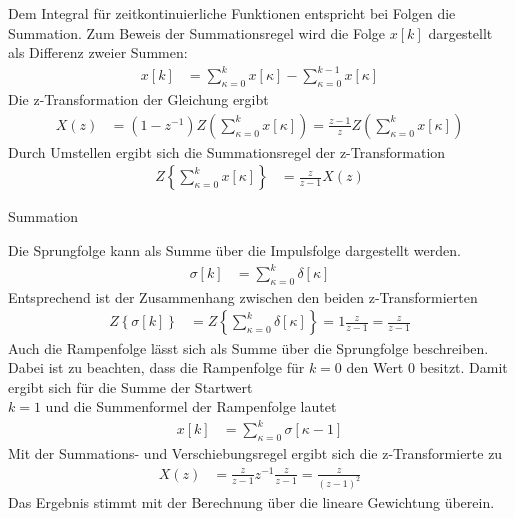 Dem Integral für zeitkontinuierliche Funktionen entspricht bei Folgen die Summation. Zum Beweis der Summationsregel wird die Folge \(x[k]\) dargestellt als Differenz zweier Summen:
\begin{align}
x[ k] &= \sum\limits_{\kappa = 0}^{k}{x[\kappa] -}\sum\limits_{\kappa = 0}^{k - 1}{x[\kappa]} \label{eq:5.61}
\end{align}
Die z-Transformation der Gleichung ergibt
\begin{align}
X(z) &= \left( 1 - z^{- 1} \right)  Z\left( \sum\limits_{\kappa = 0}^{k}{x[\kappa]} \right) = \frac{z - 1}{z}  Z\left( \sum\limits_{\kappa = 0}^{k}{x[\kappa]} \right) \label{eq:5.62}
\end{align}
Durch Umstellen ergibt sich die Summationsregel der z-Transformation
\begin{align}
Z\left\{ \sum\limits_{\kappa = 0}^{k}{x[\kappa]} \right\} &= \frac{z}{z - 1}  X(z) \label{eq:5.63}
\end{align}
\begin{example}{Summation}
\label{example:beispiel-summation}

Die Sprungfolge kann als Summe über die Impulsfolge dargestellt werden.
\begin{align*}
\sigma[ k] &= \sum\limits_{\kappa = 0}^{k}{\delta[\kappa]} 
\end{align*}
Entsprechend ist der Zusammenhang zwischen den beiden z-Transformierten
\begin{align*}
Z\left\{ \sigma[ k] \right\} &= Z\left\{ \sum\limits_{\kappa = 0}^{k}{\delta[\kappa]} \right\} = 1  \frac{z}{z - 1} = \frac{z}{z - 1} 
\end{align*}
Auch die Rampenfolge lässt sich als Summe über die Sprungfolge beschreiben. Dabei ist zu beachten, dass die Rampenfolge für \(k = 0\) den Wert 0 besitzt. Damit ergibt sich für die Summe der Startwert\\
\(k = 1\) und die Summenformel der Rampenfolge lautet
\begin{align*}
x[ k] &= \sum\limits_{\kappa = 0}^{k}{\sigma[\kappa - 1]} 
\end{align*}
Mit der Summations- und Verschiebungsregel ergibt sich die z-Transformierte zu
\begin{align*}
X(z) &= \frac{z}{z - 1}  z^{- 1}  \frac{z}{z - 1} = \frac{z}{(z - 1)^{2}} 
\end{align*}
Das Ergebnis stimmt mit der Berechnung über die lineare Gewichtung überein.

\end{example}

